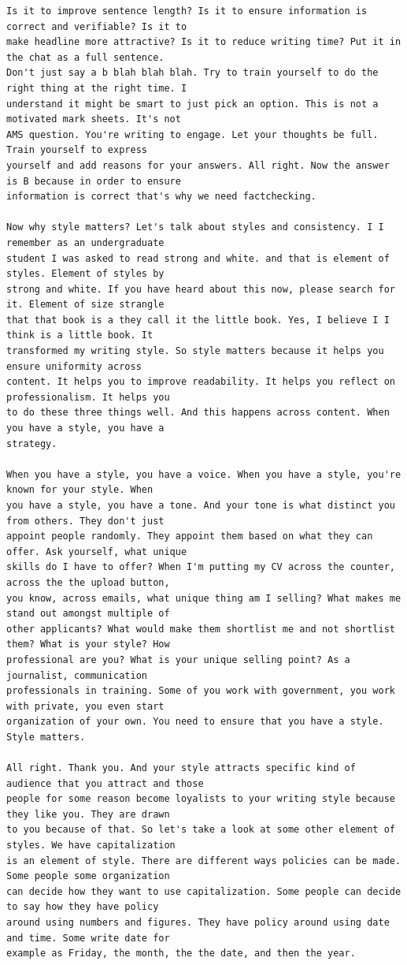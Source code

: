{\begin{Verbatim}
Is it to improve sentence length? Is it to ensure information is correct and verifiable? Is it to
make headline more attractive? Is it to reduce writing time? Put it in the chat as a full sentence.
Don't just say a b blah blah blah. Try to train yourself to do the right thing at the right time. I
understand it might be smart to just pick an option. This is not a motivated mark sheets. It's not
AMS question. You're writing to engage. Let your thoughts be full. Train yourself to express
yourself and add reasons for your answers. All right. Now the answer is B because in order to ensure
information is correct that's why we need factchecking.

Now why style matters? Let's talk about styles and consistency. I I remember as an undergraduate
student I was asked to read strong and white. and that is element of styles. Element of styles by
strong and white. If you have heard about this now, please search for it. Element of size strangle
that that book is a they call it the little book. Yes, I believe I I think is a little book. It
transformed my writing style. So style matters because it helps you ensure uniformity across
content. It helps you to improve readability. It helps you reflect on professionalism. It helps you
to do these three things well. And this happens across content. When you have a style, you have a
strategy.

When you have a style, you have a voice. When you have a style, you're known for your style. When
you have a style, you have a tone. And your tone is what distinct you from others. They don't just
appoint people randomly. They appoint them based on what they can offer. Ask yourself, what unique
skills do I have to offer? When I'm putting my CV across the counter, across the the upload button,
you know, across emails, what unique thing am I selling? What makes me stand out amongst multiple of
other applicants? What would make them shortlist me and not shortlist them? What is your style? How
professional are you? What is your unique selling point? As a journalist, communication
professionals in training. Some of you work with government, you work with private, you even start
organization of your own. You need to ensure that you have a style. Style matters.

All right. Thank you. And your style attracts specific kind of audience that you attract and those
people for some reason become loyalists to your writing style because they like you. They are drawn
to you because of that. So let's take a look at some other element of styles. We have capitalization
is an element of style. There are different ways policies can be made. Some people some organization
can decide how they want to use capitalization. Some people can decide to say how they have policy
around using numbers and figures. They have policy around using date and time. Some write date for
example as Friday, the month, the the date, and then the year.


\end{Verbatim}}
